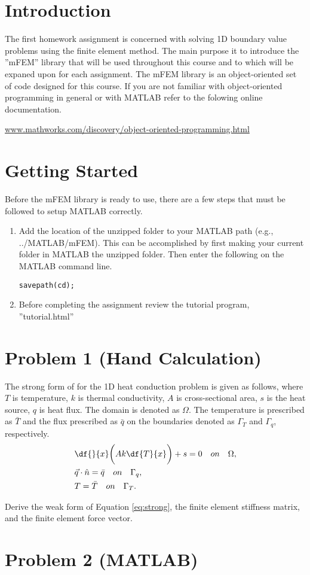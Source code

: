 \section*{Introduction}
The first homework assignment is concerned with solving 1D boundary value problems using the finite element method. The main purpose it to introduce the ''mFEM'' library that will be used throughout this course and to which will be expaned upon for each assignment. The mFEM library is an object-oriented set of code designed for this course. If you are not familiar with object-oriented programming in general or with MATLAB refer to the folowing online documentation. 
\begin{center}
\href{http://www.mathworks.com/discovery/object-oriented-programming.html}{www.mathworks.com/discovery/object-oriented-programming.html}
\end{center}

\section*{Getting Started}
Before the mFEM library is ready to use, there are a few steps that must be followed to setup MATLAB correctly.
\begin{enumerate}
\item Add the location of the unzipped folder to your MATLAB path (e.g., ../MATLAB/mFEM). This can be accomplished by first making your current folder in MATLAB the unzipped folder. Then enter the following on the MATLAB command line.
\begin{lstlisting}
savepath(cd);
\end{lstlisting} 



\item Before completing the assignment review the tutorial program, ''tutorial.html''

\end{enumerate}


\section*{Problem 1 (Hand Calculation)}
The strong form of for the 1D heat conduction problem is given as follows, where $T$ is temperature, $k$ is thermal conductivity, $A$ is cross-sectional area, $s$ is the heat source, $q$ is heat flux. The domain is denoted as $\Omega$. The temperature is prescribed as $\bar{T}$ and the flux prescribed as $\bar{q}$ on the boundaries denoted as $\Gamma_T$ and $\Gamma_q$, respectively.
\begin{equation}\begin{split}\label{eq:strong}
& \df{}{x}\bigg({Ak \df{T}{x}}\bigg) + s = 0 \quad on \quad \Omega, \\
& \vec{q}\cdot \hat{n} = \bar{q} \quad on \quad \Gamma_q, \\
& T = \bar{T} \quad on \quad \Gamma_T.
\end{split}\end{equation}

Derive the weak form of Equation \eqref{eq:strong}, the finite element stiffness matrix, and the finite element force vector.



\section*{Problem 2 (MATLAB)}
